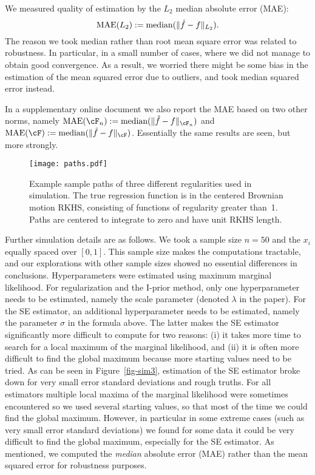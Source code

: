 \documentclass[preprint,12pt,authoryear]{elsarticle}
\DeclarePairedDelimiter{\norm}{\lVert}{\rVert}
\begin{document}
We measured quality of estimation by the $L_2$ median absolute error (MAE):
\[  \text{MAE}(L_2):=\text{median}(\norm{\hat f-f}_{L_2}). \]
The reason we took median rather than root mean square error was related to robustness. In particular, in a small number of cases, where we did not manage to obtain good convergence. As a result, we worried there might be some bias in the estimation of the mean squared error due to outliers, and took median squared error instead.


In a supplementary online document we also report the MAE based on two other norms, namely
$\text{MAE}(\cF_n):=\text{median}(\norm{\hat f-f}_{\cF_n})$ and $\text{MAE}(\cF):=\text{median}(\norm{\hat f-f}_{\cF})$.
Essentially the same results are seen, but more strongly. 


\begin{figure}[tbp]
	\centering
	\texttt{[image: paths.pdf]}
	\caption{Example sample paths of three different regularities used in simulation. The true regression function is in the centered Brownian motion RKHS, consisting of functions of regularity greater than~1. 
		Paths are centered to integrate to zero and have unit RKHS length.
	}
	\label{fig-paths}
\end{figure}


Further simulation details are as follows. We took a sample size $n=50$ and the $x_i$ equally spaced over $[0,1]$. This sample size makes the computations tractable, and our explorations with other sample sizes showed no essential differences in conclusions.
Hyperparameters were estimated using maximum marginal likelihood. For regularization and the I-prior method, only one hyperparameter needs to be estimated, namely the scale parameter (denoted $\lambda$ in the paper). For the SE estimator, an additional hyperparameter needs to be estimated, namely the parameter $\sigma$ in the formula above. The latter makes the SE estimator significantly more difficult to compute for two reasons: (i) it takes more time to search for a local maximum of the marginal likelihood, and (ii) it is often more difficult to find the global maximum because more starting values need to be tried. As can be seen in Figure~\ref{fig-sim3}, estimation of the SE estimator broke down for very small error standard deviations and rough truths. For all estimators multiple local maxima of the marginal likelihood were sometimes encountered so we used several starting values, so that most of the time we could find the global maximum. However, in particular in some extreme cases (such as very small error standard deviations) we found for some data it could be very difficult to find the global maximum, especially for the SE estimator.
As mentioned, we computed the {\em median} absolute error (MAE) rather than the mean squared error for robustness purposes. 
\end{document}
